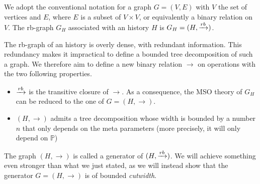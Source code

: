 
We adopt the conventional notation for a graph $G=(V,E)$ with $V$ the set of vertices and $E$, where $E$ is a subset of $V\times V$, or equivalently a binary relation on $V$. The rb-graph $G_H$ associated with an history $H$ is $G_H=(H,\xrightarrow{rb})$.

The rb-graph of an history is overly dense, with redundant information. 
This redundancy makes it impractical to define a bounded tree decomposition of such a graph. We therefore aim to define a new binary relation $\rightarrow$ on operations with the two following properties.
\begin{itemize}
	\item $\xrightarrow{rb}$ is the transitive closure of $\rightarrow$.
	As a consequence, the MSO theory of $G_H$ can be reduced to the one of $G=(H,\rightarrow)$.
	\item $(H,\rightarrow)$ admits a tree decomposition whose width is bounded by a number $n$ that only depends on the meta parameters (more precisely, it will only depend on $\mathbb{P}$)
\end{itemize}
The graph $(H,\rightarrow)$ is called a generator of $(H,\xrightarrow{rb})$.
We will achieve something even stronger than what we just stated, 
as we will instead show that the generator $G=(H,\rightarrow)$ is of bounded \emph{cutwidth}. 

